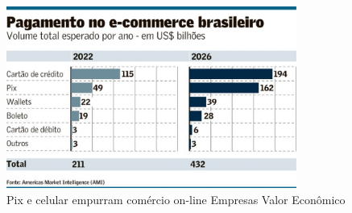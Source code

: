 \begin{escolha}
\begin{boxmedio}
\begin{boxmedio}
{\begin{boxpeq}
\begin{boxpeq}
{\begin{boxpeq}
\begin{boxmedio}
\begin{boxmedio}
\begin{boxpeq}
\begin{boxmedio}
\begin{boxpeq}
\begin{boxpeq}
\begin{boxpeq}
\begin{boxpeq}
\begin{boxmedio}
{\begin{boxmedio}
\begin{boxmedio}
\begin{boxpeq}
\begin{boxmedio}
\begin{boxpeq}
\begin{boxpeq}
\begin{boxpeq}
\begin{escolha}
{\begin{boxmedio}
\begin{boxpeq}
\begin{boxpeq}
\begin{boxpeq}
\begin{boxpeq}
\begin{boxpeq}
\begin{boxmedio}
\begin{boxpeq}
\begin{boxpeq}
\begin{boxpeq}
{\begin{boxpeq}
\begin{boxmedio}
\begin{boxpeq}
\begin{boxpeq}
\begin{boxpeq}
{\begin{boxpeq}
\begin{boxmedio}
{\begin{boxpeq}
\begin{boxpeq}
\begin{boxmedio}
\begin{boxmedio}
\begin{boxpeq}
\begin{boxpeq}
{\begin{boxpeq}
\begin{boxpeq}
\begin{boxpeq}
\begin{boxpeq}
\begin{boxpeq}
\begin{escolha}
\begin{escolha}
{\begin{boxmedio}
\begin{boxpeq}
\begin{q°}
\begin{boxmedio}
\begin{boxpeq}
\begin{boxpeq}
\begin{boxmedio}
\begin{boxmedio}
\begin{boxmedio}
\begin{boxmedio}
\begin{figure}
\centering
\includegraphics[width=3.75in,height=2.34772in]{./_SAEB_9_MAT/media/image225.jpeg}
\caption{Pix e celular empurram comércio on-line \textbar{} Empresas
\textbar{} Valor Econômico}
\end{figure}



\end{boxmedio}
\end{boxmedio}
\end{boxmedio}
\end{boxmedio}
\end{boxpeq}
\end{boxpeq}
\end{boxmedio}
\end{q°}
\end{boxpeq}
\end{boxmedio}}
\end{escolha}
\end{escolha}
\end{boxpeq}
\end{boxpeq}
\end{boxpeq}
\end{boxpeq}
\end{boxpeq}}
\end{boxpeq}
\end{boxpeq}
\end{boxmedio}
\end{boxmedio}
\end{boxpeq}
\end{boxpeq}}
\end{boxmedio}
\end{boxpeq}}
\end{boxpeq}
\end{boxpeq}
\end{boxpeq}
\end{boxmedio}
\end{boxpeq}}
\end{boxpeq}
\end{boxpeq}
\end{boxpeq}
\end{boxmedio}
\end{boxpeq}
\end{boxpeq}
\end{boxpeq}
\end{boxpeq}
\end{boxpeq}
\end{boxmedio}}
\end{escolha}
\end{boxpeq}
\end{boxpeq}
\end{boxpeq}
\end{boxmedio}
\end{boxpeq}
\end{boxmedio}
\end{boxmedio}}
\end{boxmedio}
\end{boxpeq}
\end{boxpeq}
\end{boxpeq}
\end{boxpeq}
\end{boxmedio}
\end{boxpeq}
\end{boxmedio}
\end{boxmedio}
\end{boxpeq}}
\end{boxpeq}
\end{boxpeq}}
\end{boxmedio}
\end{boxmedio}
\end{escolha}
